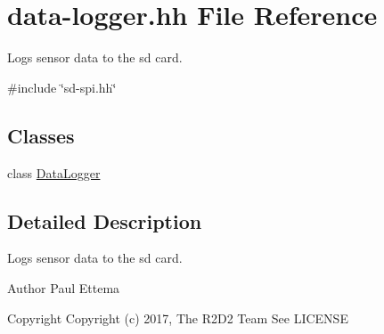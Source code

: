 \hypertarget{data-logger_8hh}{}\section{data-\/logger.hh File Reference}
\label{data-logger_8hh}


Logs sensor data to the sd card.  


{\ttfamily \#include \char`\"{}sd-\/spi.\+hh\char`\"{}}\newline
\subsection*{Classes}
\begin{DoxyCompactItemize}
\item 
class \hyperlink{class_data_logger}{Data\+Logger}
\end{DoxyCompactItemize}


\subsection{Detailed Description}
Logs sensor data to the sd card. 

\begin{DoxyAuthor}{Author}
Paul Ettema 
\end{DoxyAuthor}
\begin{DoxyCopyright}{Copyright}
Copyright (c) 2017, The R2\+D2 Team  See L\+I\+C\+E\+N\+SE 
\end{DoxyCopyright}
